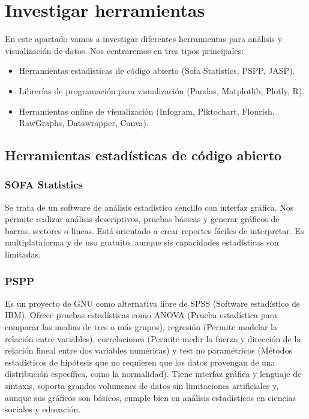\documentclass{../../miPlantilla}
\begin{document}
\maketitle

\section{Investigar herramientas}
En este apartado vamos a investigar diferentes herramientas para análisis y visualización de datos. Nos centraremos en tres tipos principales:
\begin{itemize}
    \item Herramientas estadísticas de código abierto (Sofa Statistics, PSPP, JASP).
    \item Librerías de programación para visualización (Pandas, Matplotlib, Plotly, R).
    \item Herramientas online de visualización (Infogram, Piktochart, Flourish, RawGraphs, Datawrapper, Canva).
\end{itemize}

\subsection{Herramientas estadísticas de código abierto}

\subsubsection{SOFA Statistics}
Se trata de un software de análisis estadístico sencillo con interfaz gráfica. Nos permite realizar análisis descriptivos,
pruebas básicas y generar gráficos de barras, sectores o lineas. Está orientado a crear reportes fáciles de interpretar.
Es multiplataforma y de uso gratuito, aunque sis capacidades estadísticas son limitadas.


\subsubsection{PSPP}
Es un proyecto de GNU como alternativa libre de SPSS (Software estadístico de IBM). Ofrece pruebas estadísticas como ANOVA
(Prueba estadística para comparar las medias de tres o más grupos), regresión (Permite modelar la relación entre variables),
correlaciones (Permite medir la fuerza y dirección de la relación lineal entre dos variables numéricas) y test no paramétricos
(Métodos estadísticos de hipótesis que no requieren que los datos provengan de una distribución específica, como la normalidad).
Tiene interfaz gráfica y lenguaje de sintaxis, soporta grandes volumenes de datos sin limitaciones artificiales y, aunque sus 
gráficos son básicos, cumple bien en análisis estadísticos en ciencias sociales y educación.
\end{document}

